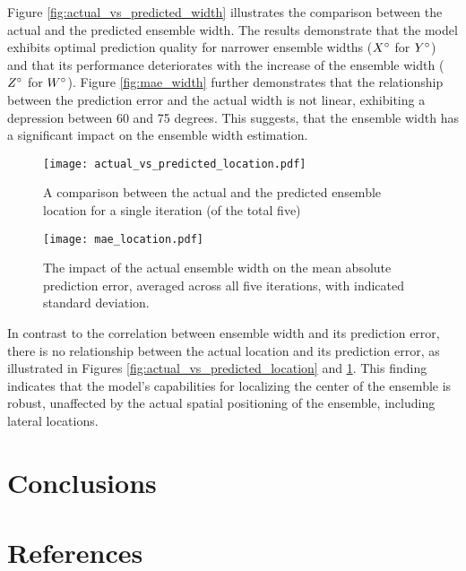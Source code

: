 \documentclass{article}
\begin{document}
Figure \ref{fig:actual_vs_predicted_width} illustrates the comparison between the actual and the predicted ensemble width. The results demonstrate that the model exhibits optimal prediction quality for narrower ensemble widths ($X\degree$ for $Y\degree$) and that its performance deteriorates with the increase of the ensemble width ($Z\degree$ for $W\degree$). Figure \ref{fig:mae_width} further demonstrates that the relationship between the prediction error and the actual width is not linear, exhibiting a depression between 60 and 75 degrees. This suggests, that the ensemble width has a significant impact on the ensemble width estimation.

\begin{figure}[ht]
  \centering
  \begin{minipage}[t]{0.45\linewidth}
    \texttt{[image: actual\_vs\_predicted\_location.pdf]}
    \caption{\label{fig:actual_vs_predicted_location}A comparison between the actual and the predicted ensemble location for a single iteration (of the total five) }
  \end{minipage}
  \hspace{0.5cm} 
  \begin{minipage}[t]{0.45\linewidth}
    \texttt{[image: mae\_location.pdf]}
    \caption{\label{fig:mae_location}The impact of the actual ensemble width on the mean absolute prediction error, averaged across all five iterations, with indicated standard deviation.}
  \end{minipage}
\end{figure}

In contrast to the correlation between ensemble width and its prediction error, there is no relationship between the actual location and its prediction error, as illustrated in Figures \ref{fig:actual_vs_predicted_location} and \ref{fig:mae_location}. This finding indicates that the model's capabilities for localizing the center of the ensemble is robust, unaffected by the actual spatial positioning of the ensemble, including lateral locations.






\section{Conclusions}
\section{References}



\end{document}
